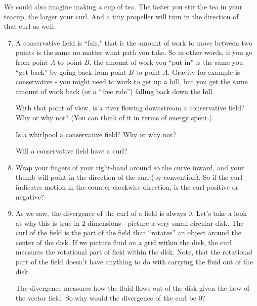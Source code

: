 \documentclass[11pt]{article}
\begin{document}
We could also imagine making a cup of tea.   The faster you stir the tea in your teacup, the larger your curl.  And a tiny propeller will turn in the direction of that curl as well.    
\begin{enumerate}\setcounter{enumi}{6}
\item  A conservative field is ``fair," that is the amount of work to move between two points is the same no matter what path you take.  So in other words, if you go from point $A$ to point $B$, the amount of work you ``put in'' is the same you ``get back'' by going back from point $B$ to point $A$.  Gravity for example is conservative - you might need to work to get up a hill, but you get the same amount of work back (or a ``free ride'') falling back down the hill.

With that point of view, is a river flowing downstream a conservative field?  Why or why not?  (You can think of it in terms of energy spent.)

\vspace{1cm}

Is a whirlpool a conservative field?  Why or why not?

\vspace{1cm}

Will a conservative field have a curl?

\vspace{1cm}

\item Wrap your fingers of your right-hand around so the curve inward, and your thumb will point in the direction of the curl (by convention).  So if the curl indicates motion in the counter-clockwise direction, is the curl positive or negative?

\vspace{1cm}

\item As we saw, the divergence of the curl of a field is always 0.   Let's take a look at why this is true in 2 dimensions - picture a very small circular disk.  The curl of the field is the part of the field that ``rotates'' an object around the center of the disk.  If we picture fluid on a grid within the disk, the curl measures the rotational part of field within the disk.  Note, that the rotational part of the field doesn't have anything to do with carrying the fluid out of the disk.

The divergence measures how the fluid flows out of the disk given the flow of the vector field.  So why would the divergence of the curl be 0?

 

\end{enumerate}
\end{document}
